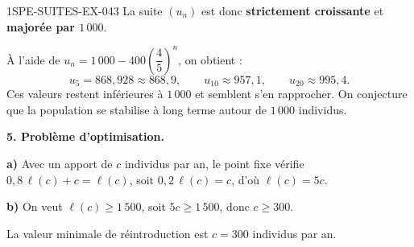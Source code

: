 \begin{corrige}{1SPE-SUITES-EX-043}
La suite $(u_n)$ est donc \textbf{strictement croissante} et \textbf{majorée par $1\,000$}.

À l'aide de $u_n = 1\,000 - 400\left(\dfrac45\right)^n$, on obtient :
\[
u_5 = 868{,}928 \approx 868{,}9, \qquad
u_{10} \approx 957{,}1, \qquad
u_{20} \approx 995{,}4.
\]
Ces valeurs restent inférieures à $1\,000$ et semblent s'en rapprocher. On conjecture que la population se stabilise à long terme autour de $1\,000$ individus.

\textbf{5. Problème d'optimisation.}

\textbf{a)} Avec un apport de $c$ individus par an, le point fixe vérifie $0{,}8\,\ell(c) + c = \ell(c)$, soit $0{,}2\,\ell(c) = c$, d'où $\ell(c) = 5c$.

\textbf{b)} On veut $\ell(c) \geq 1\,500$, soit $5c \geq 1\,500$, donc $c \geq 300$.

La valeur minimale de réintroduction est $\boxed{c = 300}$ individus par an.


\end{corrige}
